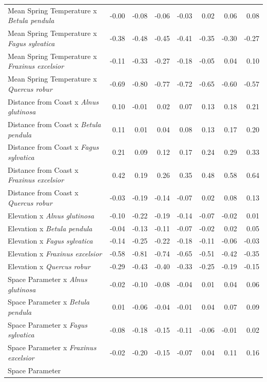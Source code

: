 \documentclass{article}\usepackage[]{graphicx}\usepackage[]{color}
\begin{document}
\begin{longtable}{lrrrrrrr}
  Mean Spring 
Temperature
x\textit{ Betula pendula} & -0.00 & -0.08 & -0.06 & -0.03 & 0.02 & 0.06 & 0.08 \\ 
  Mean Spring 
Temperature
x\textit{ Fagus sylvatica} & -0.38 & -0.48 & -0.45 & -0.41 & -0.35 & -0.30 & -0.27 \\ 
  Mean Spring 
Temperature
x\textit{ Fraxinus excelsior} & -0.11 & -0.33 & -0.27 & -0.18 & -0.05 & 0.04 & 0.10 \\ 
  Mean Spring 
Temperature
x\textit{ Quercus robur} & -0.69 & -0.80 & -0.77 & -0.72 & -0.65 & -0.60 & -0.57 \\ 
  Distance from 
Coast
x\textit{ Alnus glutinosa} & 0.10 & -0.01 & 0.02 & 0.07 & 0.13 & 0.18 & 0.21 \\ 
  Distance from 
Coast
x\textit{ Betula pendula} & 0.11 & 0.01 & 0.04 & 0.08 & 0.13 & 0.17 & 0.20 \\ 
  Distance from 
Coast
x\textit{ Fagus sylvatica} & 0.21 & 0.09 & 0.12 & 0.17 & 0.24 & 0.29 & 0.33 \\ 
  Distance from 
Coast
x\textit{ Fraxinus excelsior} & 0.42 & 0.19 & 0.26 & 0.35 & 0.48 & 0.58 & 0.64 \\ 
  Distance from 
Coast
x\textit{ Quercus robur} & -0.03 & -0.19 & -0.14 & -0.07 & 0.02 & 0.08 & 0.13 \\ 
  Elevation
x\textit{ Alnus glutinosa} & -0.10 & -0.22 & -0.19 & -0.14 & -0.07 & -0.02 & 0.01 \\ 
  Elevation
x\textit{ Betula pendula} & -0.04 & -0.13 & -0.11 & -0.07 & -0.02 & 0.02 & 0.05 \\ 
  Elevation
x\textit{ Fagus sylvatica} & -0.14 & -0.25 & -0.22 & -0.18 & -0.11 & -0.06 & -0.03 \\ 
  Elevation
x\textit{ Fraxinus excelsior} & -0.58 & -0.81 & -0.74 & -0.65 & -0.51 & -0.42 & -0.35 \\ 
  Elevation
x\textit{ Quercus robur} & -0.29 & -0.43 & -0.40 & -0.33 & -0.25 & -0.19 & -0.15 \\ 
  Space Parameter
x\textit{ Alnus glutinosa} & -0.02 & -0.10 & -0.08 & -0.04 & 0.01 & 0.04 & 0.06 \\ 
  Space Parameter
x\textit{ Betula pendula} & 0.01 & -0.06 & -0.04 & -0.01 & 0.04 & 0.07 & 0.09 \\ 
  Space Parameter
x\textit{ Fagus sylvatica} & -0.08 & -0.18 & -0.15 & -0.11 & -0.06 & -0.01 & 0.02 \\ 
  Space Parameter
x\textit{ Fraxinus excelsior} & -0.02 & -0.20 & -0.15 & -0.07 & 0.04 & 0.11 & 0.16 \\ 
  Space Parameter

\end{longtable}
\end{document}
